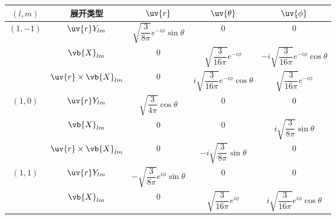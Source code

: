 \newpage
\begin{longtable}{ccccc}
	\toprule[1pt]
	\((l,m)\) & 展开类型                        & \(\uv{r}\)                                                & \(\uv{\theta}\)                                             & \(\uv{\phi}\)                                                \\
	\midrule[0.6pt]
	\multirow{3}{*}{\((1,-1)\)}
	          & \(\uv{r}Y_{lm}\)            & \(\sqrt{\dfrac{3}{8\pi}}e^{-i\phi}\sin\theta\)            & \(0\)                                                       & \(0\)                                                        \\
	\cmidrule(lr){2-5}
	          & \(\vb{X}_{lm}\)             & \(0\)                                                     & \(\sqrt{\dfrac{3}{16\pi}}e^{-i\phi}\)                       & \(-i\sqrt{\dfrac{3}{16\pi}}e^{-i\phi}\cos\theta\)            \\
	\cmidrule(lr){2-5}
	          & \(\uv{r}\times\vb{X}_{lm}\) & \(0\)                                                     & \(i\sqrt{\dfrac{3}{16\pi}}e^{-i\phi}\cos\theta\)            & \(\sqrt{\dfrac{3}{16\pi}}e^{-i\phi}\)                        \\
	\midrule
	\multirow{3}{*}{\((1,0)\)}
	          & \(\uv{r}Y_{lm}\)            & \(\sqrt{\dfrac{3}{4\pi}}\cos\theta\)                      & \(0\)                                                       & \(0\)                                                        \\
	\cmidrule(lr){2-5}
	          & \(\vb{X}_{lm}\)             & \(0\)                                                     & \(0\)                                                       & \(i\sqrt{\dfrac{3}{8\pi}}\sin\theta\)                        \\
	\cmidrule(lr){2-5}
	          & \(\uv{r}\times\vb{X}_{lm}\) & \(0\)                                                     & \(-i\sqrt{\dfrac{3}{8\pi}}\sin\theta\)                      & \(0\)                                                        \\
	\midrule
	\multirow{3}{*}{\((1,1)\)}
	          & \(\uv{r}Y_{lm}\)            & \(-\sqrt{\dfrac{3}{8\pi}}e^{i\phi}\sin\theta\)            & \(0\)                                                       & \(0\)                                                        \\
	\cmidrule(lr){2-5}
	          & \(\vb{X}_{lm}\)             & \(0\)                                                     & \(\sqrt{\dfrac{3}{16\pi}}e^{i\phi}\)                        & \(i\sqrt{\dfrac{3}{16\pi}}e^{i\phi}\cos\theta\)              \\

\end{longtable}
